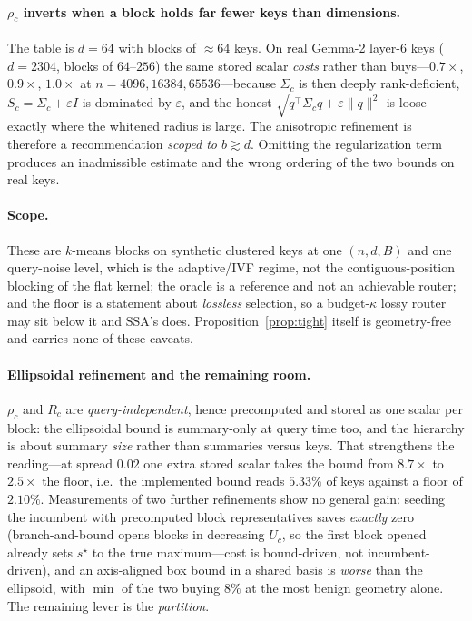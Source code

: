 \documentclass[11pt]{article}
\numberwithin{equation}{section}
\begin{document}
\paragraph{$\rho_c$ inverts when a block holds far fewer keys than dimensions.} The table is $d=64$ with
blocks of $\approx 64$ keys. On real Gemma-2 layer-6 keys ($d=2304$, blocks of $64$--$256$) the same stored
scalar \emph{costs} rather than buys---$0.7\times$, $0.9\times$, $1.0\times$ at $n=4096,16384,65536$---because
$\Sigma_c$ is then deeply rank-deficient, $S_c=\Sigma_c+\varepsilon I$ is dominated by $\varepsilon$, and the
honest $\sqrt{q^\top\Sigma_c q+\varepsilon\lVert q\rVert^2}$ is loose exactly where the whitened radius is
large. The anisotropic refinement is therefore a recommendation \emph{scoped to $b\gtrsim d$}. Omitting the
regularization term produces an inadmissible estimate and the wrong ordering of the two bounds on real keys.

\paragraph{Scope.} These are $k$-means blocks on synthetic clustered keys at one $(n,d,B)$ and one query-noise
level, which is the adaptive/IVF regime, not the contiguous-position blocking of the flat kernel; the oracle
is a reference and not an achievable router; and the floor is a statement about \emph{lossless} selection, so
a budget-$\kappa$ lossy router may sit below it and SSA's does. Proposition~\ref{prop:tight} itself is
geometry-free and carries none of these caveats.

\paragraph{Ellipsoidal refinement and the remaining room.} $\rho_c$ and $R_c$ are
\emph{query-independent}, hence precomputed and stored as one scalar per block: the ellipsoidal bound is
summary-only at query time too, and the hierarchy is about summary \emph{size} rather than summaries versus
keys. That strengthens the reading---at spread $0.02$ one extra stored scalar takes the bound from $8.7\times$
to $2.5\times$ the floor, i.e.\ the implemented bound reads $5.33\%$ of keys against a floor of $2.10\%$.
Measurements of two further refinements show no general gain: seeding the incumbent with
precomputed block representatives saves \emph{exactly} zero (branch-and-bound opens blocks in decreasing
$U_c$, so the first block opened already sets $s^\star$ to the true maximum---cost is bound-driven, not
incumbent-driven), and an axis-aligned box bound in a shared basis is \emph{worse} than the ellipsoid, with
$\min$ of the two buying $8\%$ at the most benign geometry alone. The remaining lever is the \emph{partition}.
\end{document}
